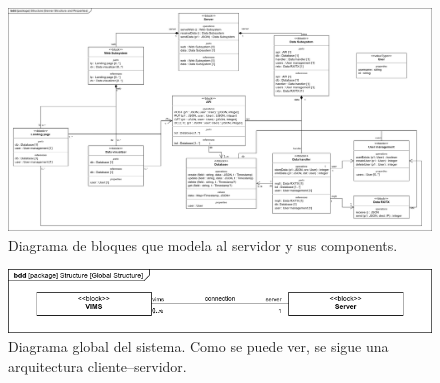 \begin{figure}[H]
  \centering
  \includegraphics[width=\linewidth]{images/BlockDiagrams-Server.drawio.png}
  \caption{Diagrama de bloques que modela al servidor y sus components.}
  \label{bd:server}
\end{figure}

\begin{figure}[H]
  \centering
  \includegraphics[width=\linewidth]{images/BlockDiagrams-Global.drawio.png}
  \caption{Diagrama global del sistema. Como se puede ver, se sigue una arquitectura cliente--servidor.}
  \label{bd:global}
\end{figure}
